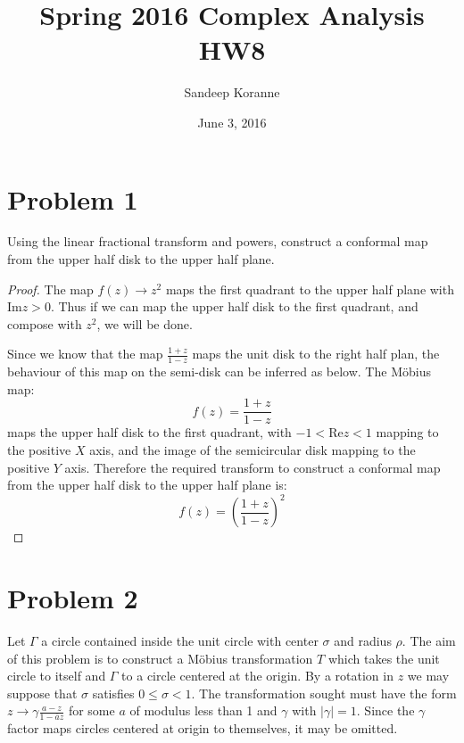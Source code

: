 \documentclass{article}[12pt]
\begin{document}
\title{Spring 2016 Complex Analysis HW8}
\author{Sandeep Koranne}
\date{June 3, 2016}
\maketitle


\section*{Problem 1}Using the linear fractional transform and powers,
construct a conformal map from the upper half disk to the upper
half plane.
\begin{proof}
The map $f(z)\to z^2$ maps the first quadrant to the upper half plane
with $\mbox{Im}z>0$. Thus if we can map the upper half disk to the
first quadrant, and compose with $z^2$, we will be done.

Since we know that the map $\frac{1+z}{1-z}$ maps the unit disk to the
right half plan, the behaviour of this map on the semi-disk can be
inferred as below.
The M\"obius map:
\[
f(z) = \frac{1+z}{1-z}
\]
maps the upper half disk to the first quadrant, with $-1<\mbox{Re}z<1$ mapping
to the positive $X$ axis, and the image of the semicircular disk
mapping to the positive $Y$ axis. Therefore the required transform
to construct a conformal map from the upper half disk to the upper
half plane is:
\[
f(z) = \left(\frac{1+z}{1-z}\right)^2
\]
\end{proof}

\section*{Problem 2}
Let $\Gamma$ a circle contained inside the unit circle with center
$\sigma$ and radius $\rho$. The aim of this problem is to construct
a M\"obius transformation $T$ which takes the unit circle to itself
and $\Gamma$ to a circle centered at the origin. By a rotation in $z$
we may suppose that $\sigma$ satisfies $0\le \sigma < 1$. The transformation
sought must have the form $z\to \gamma\frac{a-z}{1-\overline{a}z}$ for
some $a$ of modulus less than 1 and $\gamma$ with $|\gamma|=1$.
Since the $\gamma$ factor maps circles centered at origin to
themselves, it may be omitted.
\end{document}
